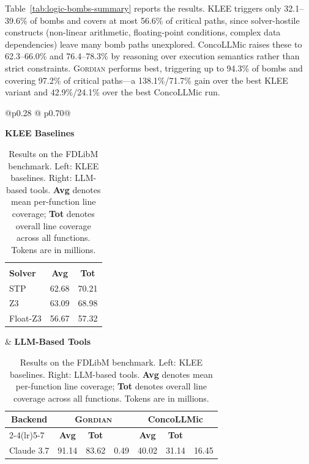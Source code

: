 \documentclass[acmsmall]{acmart}
\newcommand{\projName}{\textsc{Gordian}\xspace}
\theoremstyle{definition}
\begin{document}
Table~\ref{tab:logic-bombs-summary} reports the results. KLEE triggers only 32.1--39.6\% of bombs and covers at most 56.6\% of critical paths, since solver-hostile constructs (non-linear arithmetic, floating-point conditions, complex data dependencies) leave many bomb paths unexplored. ConcoLLMic raises these to 62.3--66.0\% and 76.4--78.3\% by reasoning over execution semantics rather than strict constraints. \projName{} performs best, triggering up to 94.3\% of bombs and covering 97.2\% of critical paths---a 138.1\%/71.7\% gain over the best KLEE variant and 42.9\%/24.1\% over the best ConcoLLMic run.

\begin{table}[ht]%
\centering
\caption{Results on the FDLibM benchmark.
Left: KLEE baselines.
Right: LLM-based tools.
\textbf{Avg} denotes mean per-function line coverage;
\textbf{Tot} denotes overall line coverage across all functions.
Tokens are in millions.}
\label{tab:FDLibM-summary}
\footnotesize
\vspace{-2mm}
\begin{tabular}{@{}p{}
@{\hspace{0.00\columnwidth}}
p{}@{}}

\raggedright
\centering\textbf{KLEE Baselines}\par\vspace{2pt}
\centering
\begin{tabular}{|l|cc|}
\toprule
\multicolumn{3}{|c|}{\rule{0pt}{3.2ex}} \\   %
\textbf{Solver}
& \textbf{Avg}
& \textbf{Tot} \\
\midrule
STP        & 62.68 & 70.21 \\
Z3         & 63.09 & 68.98 \\
Float-Z3   & 56.67 & 57.32 \\
\bottomrule
\end{tabular}

&
\centering\textbf{LLM-Based Tools}\par\vspace{2pt}
\centering
\begin{tabular}{|l|ccc|ccc|}
\toprule
\multicolumn{1}{|c|}{\textbf{Backend}}
& \multicolumn{3}{c|}{\textbf{\projName{}}}
& \multicolumn{3}{c|}{\textbf{ConcoLLMic}} \\
\cmidrule(lr){2-4}\cmidrule(lr){5-7}
& \textbf{Avg}
& \textbf{Tot}
& \makecell{\textbf{Tokens}}
& \textbf{Avg}
& \textbf{Tot}
& \makecell{\textbf{Tokens}} \\
\midrule
Claude 3.7
& 91.14 & 83.62 & 0.49
& 40.02 & 31.14 & 16.45 \\


\end{tabular}
\end{tabular}
\end{table}
\end{document}
